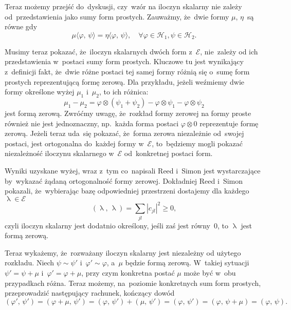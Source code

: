 \documentclass[a4paper,11pt]{article}
\newcommand{\mc}{\mathcal}
\providecommand{\absd}[1]{\left| #1 \right|}
\providecommand{\absd}[1]{\left| \, #1 \, \right|}
\newcommand{\la}{\uplambda}
\newcommand{\vp}{\varphi}
\newcommand{\Hc}{\mc{H}}
\newcommand{\ot}{\otimes}
\newcommand{\Sum}{\sum\limits}
\newcommand{\lket}{\langle}
\newcommand{\rket}{\rangle}
\newcommand{\SP}[2]{( #1, \, #2 )}  %
\newcommand{\dket}[2]{\lket #1, \, #2 \rket}  %
\begin{document}
Teraz możemy przejść do~dyskusji, czy~wzór na iloczyn skalarny nie
zależy od~przedstawienia jako sumy form prostych. Zauważmy, że~dwie
formy $\mu$, $\eta$~są równe gdy
\begin{equation*}
  \mu\dket{ \vp }{ \psi } = \eta\dket{ \vp }{ \psi },
  \quad \forall \vp \in \Hc_{ 1 }, \psi \in \Hc_{ 2 }.
\end{equation*}

Musimy teraz pokazać, że~iloczyn skalarnych dwóch form z~$\mc{E}$,
nie~zależy od ich przedstawienia w~postaci sumy form prostych.
Kluczowe tu jest wynikający z~definicji fakt, że~dwie różne postaci
tej samej formy różnią się o~sumę form prostych reprezentującą formę
zerową. Dla przykładu, jeżeli weźmiemy dwie formy określone wyżej
$\mu_{ 1 }$ i~$\mu_{ 2 }$, to ich różnica:
\begin{equation*}
  \mu_{ 1 } - \mu_{ 2 } = \vp \ot ( \psi_{ 1 } + \psi_{ 2 } )
  - \vp \ot \psi_{ 1 } - \vp \ot \psi_{ 2 }
\end{equation*}
jest formą zerową. Zwróćmy uwagę, że~rozkład formy zerowej na formy
proste również nie jest jednoznaczny, np.~każda forma postaci
$\vp \ot 0$ reprezentuje formę zerową. Jeżeli teraz uda~się pokazać,
że~forma zerowa niezależnie od~swojej postaci, jest ortogonalna
do~każdej formy w~$\mc{E}$, to~będziemy mogli pokazać niezależność
iloczynu skalarnego w~$\mc{E}$ od~konkretnej postaci form.

Wyniki uzyskane wyżej, wraz z~tym co~napisali Reed i~Simon jest
wystarczające by~wykazać żądaną ortogonalność formy zerowej.
Dokładniej Reed i~Simon pokazali, że~wybierając bazę odpowiedniej
przestrzeni dostajemy dla każdego $\la \in \mc{E}$
\begin{equation*}
  ( \la, \, \la ) = \Sum_{ j l } \absd{ c_{ j l } }^{ 2 } \geq 0,
\end{equation*}
czyli iloczyn skalarny jest dodatnio określony, jeśli zaś jest
równy~0, to $\la$ jest formą zerową.

Teraz wykażemy, że~rozważany iloczyn skalarny jest niezależny od
użytego rozkładu. Niech $\psi \sim \psi'$ i~$\vp' \sim \vp$, a~$\mu$
będzie formą zerową. W~takiej sytuacji $\psi' = \psi + \mu$
i~$\vp' = \vp + \mu$, przy czym konkretna postać $\mu$ może być w~obu
przypadkach różna. Teraz możemy, na~poziomie konkretnych sum form
prostych, przeprowadzić następujący rachunek, kończący dowód
\begin{equation*}
  \SP{ \vp' }{ \psi' } = \SP{ \vp + \mu }{ \psi' }
  = \SP{ \vp }{ \psi' } + \SP{ \mu }{ \psi' } = \SP{ \vp }{ \psi' }
  = \SP{ \vp }{ \psi + \mu } = \SP{ \vp }{ \psi }.
\end{equation*}
\end{document}
